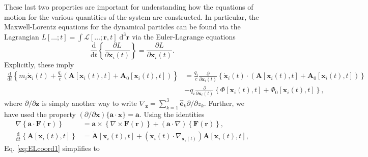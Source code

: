 These last two properties are important for understanding how the equations of motion for the various quantities of the system are constructed. In particular, the Maxwell-Lorentz equations for the dynamical particles can be found via the Lagrangian $L[\ldots;t] = \int\mathcal{L}[\ldots;\mathbf{r},t]\;\mathrm{d}^3\mathbf{r}$ via the Euler-Lagrange equations
\begin{equation}
\frac{\mathrm{d}}{\mathrm{d}t}\left\{\frac{\partial L}{\partial \dot{\mathbf{x}}_i(t)}\right\} = \frac{\partial L}{\partial \mathbf{x}_i(t)}.
\end{equation}
Explicitly, these imply
\begin{equation}\label{eq:ELcoord1}
\begin{split}
\frac{\mathrm{d}}{\mathrm{d}t}\left\{m_i\dot{\mathbf{x}}_i(t) + \frac{q_i}{c}\left(\mathbf{A}[\mathbf{x}_i(t),t] + \mathbf{A}_0[\mathbf{x}_i(t),t]\right)\right\} &= \frac{q_i}{c}\frac{\partial}{\partial\mathbf{x}_i(t)}\left\{\dot{\mathbf{x}}_i(t)\cdot\left(\mathbf{A}[\mathbf{x}_i(t),t] + \mathbf{A}_0[\mathbf{x}_i(t),t]\right)\right\}\\
&- q_i\frac{\partial}{\partial\mathbf{x}_i(t)}\left\{\Phi[\mathbf{x}_i(t),t] + \Phi_0[\mathbf{x}_i(t),t]\right\},
\end{split}
\end{equation}
where $\partial/\partial\mathbf{z}$ is simply another way to write $\nabla_{\mathbf{z}} = \sum_{k = 1}^3\hat{\mathbf{e}}_k\partial/\partial z_k$. Further, we have used the property $(\partial/\partial\mathbf{x})\{\mathbf{a}\cdot\mathbf{x}\} = \mathbf{a}$. Using the identities
\begin{equation}
\begin{split}
\nabla\left\{\mathbf{a}\cdot\mathbf{F}(\mathbf{r})\right\} &= \mathbf{a}\times\left\{\nabla\times\mathbf{F}(\mathbf{r})\right\} + (\mathbf{a}\cdot\nabla)\left\{\mathbf{F}(\mathbf{r})\right\},\\
\frac{\mathrm{d}}{\mathrm{d}t}\left\{\mathbf{A}[\mathbf{x}_i(t),t]\right\} &= \dot{\mathbf{A}}[\mathbf{x}_i(t),t] + \left(\dot{\mathbf{x}}_i(t)\cdot\nabla_{\mathbf{x}_i(t)}\right)\mathbf{A}[\mathbf{x}_i(t),t],
\end{split}
\end{equation}
Eq. \eqref{eq:ELcoord1} simplifies to
